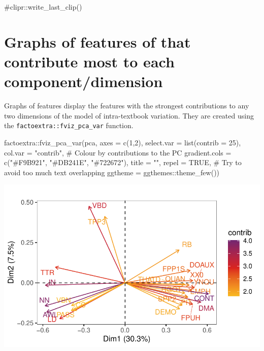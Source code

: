 \documentclass[
  letterpaper,
  DIV=11,
  numbers=noendperiod]{scrreprt}
\newenvironment{Shaded}{\begin{snugshade}}{\end{snugshade}}
\newcommand{\AttributeTok}[1]{\textcolor[rgb]{0.40,0.45,0.13}{#1}}
\newcommand{\CommentTok}[1]{\textcolor[rgb]{0.37,0.37,0.37}{#1}}
\newcommand{\ConstantTok}[1]{\textcolor[rgb]{0.56,0.35,0.01}{#1}}
\newcommand{\DecValTok}[1]{\textcolor[rgb]{0.68,0.00,0.00}{#1}}
\newcommand{\FunctionTok}[1]{\textcolor[rgb]{0.28,0.35,0.67}{#1}}
\newcommand{\NormalTok}[1]{\textcolor[rgb]{0.00,0.23,0.31}{#1}}
\newcommand{\SpecialCharTok}[1]{\textcolor[rgb]{0.37,0.37,0.37}{#1}}
\newcommand{\StringTok}[1]{\textcolor[rgb]{0.13,0.47,0.30}{#1}}
\begin{document}
\begin{Shaded}
\begin{Highlighting}[]
\CommentTok{\#clipr::write\_last\_clip()}
\end{Highlighting}
\end{Shaded}

\section{Graphs of features of that contribute most to each
component/dimension}\label{graphs-of-features-of-that-contribute-most-to-each-componentdimension}

Graphs of features display the features with the strongest contributions
to any two dimensions of the model of intra-textbook variation. They are
created using the \texttt{factoextra::fviz\_pca\_var} function.

\begin{Shaded}
\begin{Highlighting}[]
\NormalTok{factoextra}\SpecialCharTok{::}\FunctionTok{fviz\_pca\_var}\NormalTok{(pca,}
             \AttributeTok{axes =} \FunctionTok{c}\NormalTok{(}\DecValTok{1}\NormalTok{,}\DecValTok{2}\NormalTok{),}
             \AttributeTok{select.var =} \FunctionTok{list}\NormalTok{(}\AttributeTok{contrib =} \DecValTok{25}\NormalTok{),}
             \AttributeTok{col.var =} \StringTok{"contrib"}\NormalTok{, }\CommentTok{\# Colour by contributions to the PC}
             \AttributeTok{gradient.cols =} \FunctionTok{c}\NormalTok{(}\StringTok{"\#F9B921"}\NormalTok{, }\StringTok{"\#DB241E"}\NormalTok{, }\StringTok{"\#722672"}\NormalTok{),}
             \AttributeTok{title =} \StringTok{""}\NormalTok{,}
             \AttributeTok{repel =} \ConstantTok{TRUE}\NormalTok{, }\CommentTok{\# Try to avoid too much text overlapping}
             \AttributeTok{ggtheme =}\NormalTok{ ggthemes}\SpecialCharTok{::}\FunctionTok{theme\_few}\NormalTok{())}
\end{Highlighting}
\end{Shaded}

\includegraphics{AppendixH_files/figure-pdf/graphs-of-variables-1.pdf}
\end{document}
